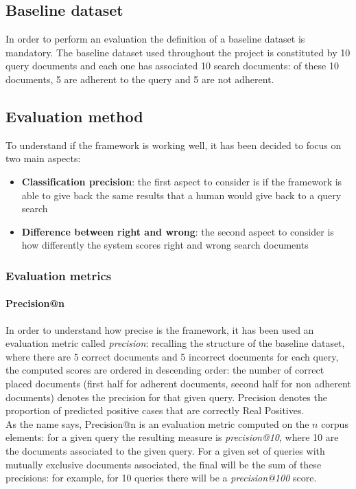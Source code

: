 \documentclass[\main/main.tex]{subfiles}
\begin{document}
\subsection{Baseline dataset}
In order to perform an evaluation the definition of a baseline dataset is mandatory. The baseline dataset used throughout the project is constituted by 10 query documents and each one has associated 10 search documents: of these 10 documents, 5 are adherent to the query and 5 are not adherent.
\subsection{Evaluation method}
To understand if the framework is working well, it has been decided to focus on two main aspects:
\begin{itemize}
    \item \textbf{Classification precision}: the first aspect to consider is if the framework is able to give back the same results that a human would give back to a query search
    \item \textbf{Difference between right and wrong}: the second aspect to consider is how differently the system scores right and wrong search documents
\end{itemize}
\subsubsection{Evaluation metrics}
\paragraph{Precision@n} In order to understand how precise is the framework, it has been used an evaluation metric called \emph{precision}: recalling the structure of the baseline dataset, where there are 5 correct documents and 5 incorrect documents for each query, the computed scores are ordered in descending order: the number of correct placed documents (first half for adherent documents, second half for non adherent documents) denotes the precision for that given query. Precision denotes the proportion of predicted positive cases that are correctly Real Positives\cite{DBLP:journals/corr/abs-2010-16061}.\\
As the name says, Precision@n is an evaluation metric computed on the $n$ corpus elements: for a given query the resulting measure is \emph{precision@10}, where 10 are the documents associated to the given query. For a given set of queries with mutually exclusive documents associated, the final will be the sum of these precisions: for example, for 10 queries there will be a \emph{precision@100} score.
\end{document}
